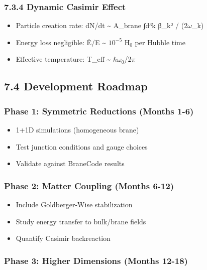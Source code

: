 \documentclass[
  11pt,
]{report}
\providecommand{\tightlist}{%
  \setlength{\itemsep}{0pt}\setlength{\parskip}{0pt}}
\begin{document}
\subsubsection{7.3.4 Dynamic Casimir
Effect}\label{dynamic-casimir-effect}

\begin{itemize}
\tightlist
\item
  Particle creation rate: dN/dt \textasciitilde{} A\_brane ∫d³k
  \textbar β\_k\textbar² / (2\(\omega\)\_k)
\item
  Energy loss negligible: Ė/E \textasciitilde{} \(10^{-5}\) H\(_0\) per
  Hubble time
\item
  Effective temperature: T\_eff \textasciitilde{}
  \(\hbar\omega\)\(_0\)/2\(\pi\)
\end{itemize}

\subsection{7.4 Development Roadmap}\label{development-roadmap}

\subsubsection{Phase 1: Symmetric Reductions (Months
1-6)}\label{phase-1-symmetric-reductions-months-1-6}

\begin{itemize}
\tightlist
\item
  1+1D simulations (homogeneous brane)
\item
  Test junction conditions and gauge choices
\item
  Validate against BraneCode results
\end{itemize}

\subsubsection{Phase 2: Matter Coupling (Months
6-12)}\label{phase-2-matter-coupling-months-6-12}

\begin{itemize}
\tightlist
\item
  Include Goldberger-Wise stabilization
\item
  Study energy transfer to bulk/brane fields
\item
  Quantify Casimir backreaction
\end{itemize}

\subsubsection{Phase 3: Higher Dimensions (Months
12-18)}\label{phase-3-higher-dimensions-months-12-18}
\end{document}
